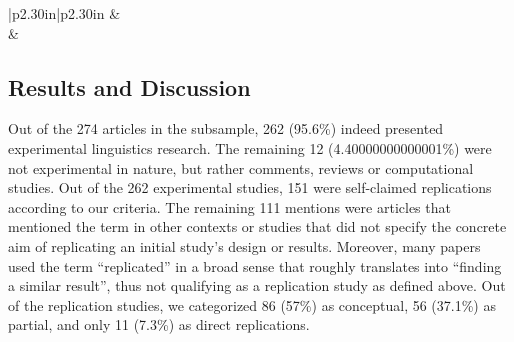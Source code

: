 \documentclass[cm,linguex]{glossa}
\begin{document}
\begin{longtable}[c]{|p{2.30in}|p{2.30in}}
 &  \\





 &  \\




\end{longtable}

\hypertarget{results-and-discussion-1}{%
\subsection{Results and Discussion}\label{results-and-discussion-1}}

Out of the 274 articles in the subsample, 262 (95.6\%) indeed presented experimental linguistics research. The remaining 12 (4.40000000000001\%) were not experimental in nature, but rather comments, reviews or computational studies. Out of the 262 experimental studies, 151 were self-claimed replications according to our criteria. The remaining 111 mentions were articles that mentioned the term in other contexts or studies that did not specify the concrete aim of replicating an initial study's design or results. Moreover, many papers used the term ``replicated'' in a broad sense that roughly translates into ``finding a similar result'', thus not qualifying as a replication study as defined above.
Out of the replication studies, we categorized 86 (57\%) as conceptual, 56 (37.1\%) as partial, and only 11 (7.3\%) as direct replications.
\end{document}
